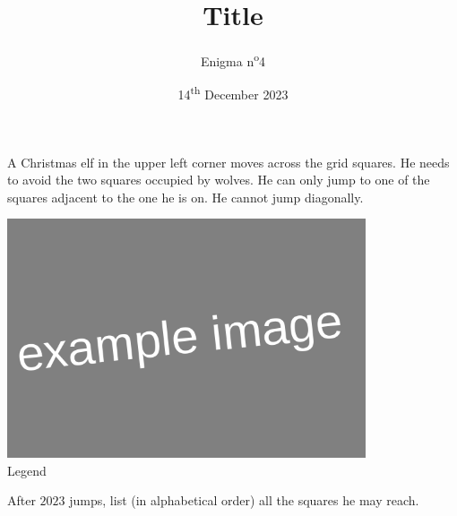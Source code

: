 \documentclass[a4paper, top=10mm]{article}
\title{\textbf{\huge{Title}}}
\author{Enigma n\textsuperscript{o}4}
\date{14\textsuperscript{th} December 2023}
\begin{document}
	\maketitle
	
	A Christmas elf in the upper left corner moves across the grid squares.
	He needs to avoid the two squares occupied by wolves.
	He can only jump to one of the squares adjacent to the one he is on.
	He cannot jump diagonally.
	
	\begin{center}
		\includegraphics[height=200pt]{00example.png}\\
		Legend
	\end{center}
	
	After $2023$ jumps, list (in alphabetical order) all the squares he may reach.
	
\end{document}
